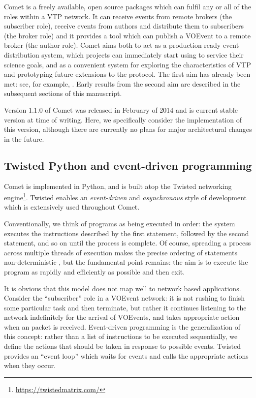 \documentclass[5p,authoryear]{elsarticle}
\begin{document}
Comet is a freely available, open source packages which can fulfil any or all
of the roles within a VTP network. It can receive events from remote brokers
(the subscriber role), receive events from authors and distribute them to
subscribers (the broker role) and it provides a tool which can publish a
VOEvent to a remote broker (the author role). Comet aims both to act as a
production-ready event distribution system, which projects can immediately
start using to service their science goals, and as a convenient system for
exploring the characteristics of VTP and prototyping future extensions to the
protocol. The first aim has already been met: see, for example,
\citet{Staley:2013}. Early results from the second aim are described in the
subsequent sections of this manuscript.

Version 1.1.0 of Comet was released in February of 2014 and is current stable
version at time of writing. Here, we specifically consider the implementation
of this version, although there are currently no plans for major architectural
changes in the future.

\subsection{Twisted Python and event-driven programming}
\label{sec:design:twisted}

Comet is implemented in Python, and is built atop the Twisted networking
engine\footnote{\url{https://twistedmatrix.com/}}. Twisted enables an
\textit{event-driven} and \textit{asynchronous} style of development which is
extensively used throughout Comet.

Conventionally, we think of programs as being executed in order: the system
executes the instructions described by the first statement, followed by the
second statement, and so on until the process is complete. Of course,
spreading a process across multiple threads of execution makes the precise
ordering of statements non-deterministic \citep[and, indeed, introduces a whole
new level of complexity in the process;][]{Lee:2006}, but the fundamental
point remains: the aim is to execute the program as rapidly and efficiently as
possible and then exit.

It is obvious that this model does not map well to network based applications.
Consider the ``subscriber'' role in a VOEvent network: it is not rushing to
finish some particular task and then terminate, but rather it continues
listening to the network indefinitely for the arrival of VOEvents, and takes
appropriate action when an packet is received. Event-driven programming is the
generalization of this concept: rather than a list of instructions to be
executed sequentially, we define the actions that should be taken in response
to possible events. Twisted provides an ``event loop'' which waits for events
and calls the appropriate actions when they occur.
\end{document}
